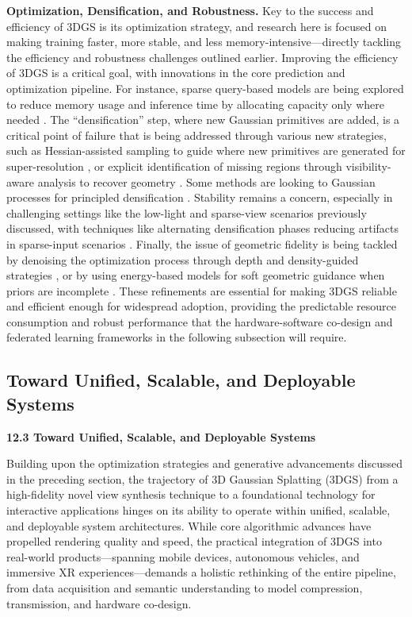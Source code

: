 \documentclass[11pt]{article}
\begin{document}
\textbf{Optimization, Densification, and Robustness.} Key to the success and efficiency of 3DGS is its optimization strategy, and research here is focused on making training faster, more stable, and less memory-intensive---directly tackling the efficiency and robustness challenges outlined earlier. Improving the efficiency of 3DGS is a critical goal, with innovations in the core prediction and optimization pipeline. For instance, sparse query-based models are being explored to reduce memory usage and inference time by allocating capacity only where needed \cite{ref773}. The ``densification'' step, where new Gaussian primitives are added, is a critical point of failure that is being addressed through various new strategies, such as Hessian-assisted sampling to guide where new primitives are generated for super-resolution \cite{ref774}, or explicit identification of missing regions through visibility-aware analysis to recover geometry \cite{ref775}. Some methods are looking to Gaussian processes for principled densification \cite{ref776}. Stability remains a concern, especially in challenging settings like the low-light and sparse-view scenarios previously discussed, with techniques like alternating densification phases reducing artifacts in sparse-input scenarios \cite{ref179}. Finally, the issue of geometric fidelity is being tackled by denoising the optimization process through depth and density-guided strategies \cite{ref264}, or by using energy-based models for soft geometric guidance when priors are incomplete \cite{ref194}. These refinements are essential for making 3DGS reliable and efficient enough for widespread adoption, providing the predictable resource consumption and robust performance that the hardware-software co-design and federated learning frameworks in the following subsection will require.

\subsection{Toward Unified, Scalable, and Deployable Systems}

\textbf{12.3 Toward Unified, Scalable, and Deployable Systems}

Building upon the optimization strategies and generative advancements discussed in the preceding section, the trajectory of 3D Gaussian Splatting (3DGS) from a high-fidelity novel view synthesis technique to a foundational technology for interactive applications hinges on its ability to operate within unified, scalable, and deployable system architectures. While core algorithmic advances have propelled rendering quality and speed, the practical integration of 3DGS into real-world products---spanning mobile devices, autonomous vehicles, and immersive XR experiences---demands a holistic rethinking of the entire pipeline, from data acquisition and semantic understanding to model compression, transmission, and hardware co-design.
\end{document}
